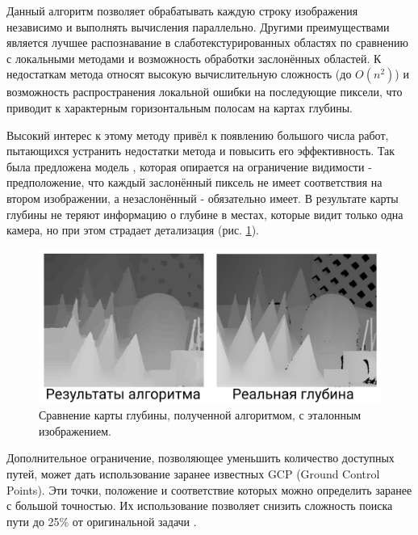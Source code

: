Данный алгоритм позволяет обрабатывать каждую строку изображения независимо и выполнять вычисления параллельно. Другими преимуществами является лучшее распознавание в слаботекстурированных 
областях по сравнению с локальными методами и возможность обработки заслонённых областей.   %
К недостаткам метода относят высокую вычислительную сложность (до $O(n^2)$) и возможность распространения локальной ошибки на последующие пиксели, что приводит к характерным горизонтальным полосам на картах глубины. 

Высокий интерес к этому методу привёл к появлению большого числа работ, пытающихся устранить недостатки метода и повысить его эффективность. Так была предложена модель \cite{symmetric}, которая 
опирается на ограничение видимости - предположение, что каждый заслонённый пиксель не имеет соответствия на втором изображении, а незаслонённый - обязательно имеет. В результате карты глубины не теряют информацию о глубине 
в местах, которые видит только одна камера, но при этом страдает детализация (рис. \ref{pic:symmetry}). 
\begin{figure}[H]
	\begin{center}
		\includegraphics[scale=0.3]{pics/symmetric_rus.png}
		\caption{ Сравнение карты глубины, полученной алгоритмом, с эталонным изображением. } 
		\label{pic:symmetry} %
	\end{center}
\end{figure}
Дополнительное ограничение, позволяющее уменьшить количество доступных путей, может дать использование заранее известных GCP (Ground Control Points). Эти точки, положение и 
соответствие которых можно определить заранее с большой точностью. Их использование позволяет снизить сложность поиска пути до 25\% от оригинальной задачи \cite{DSI}. 


